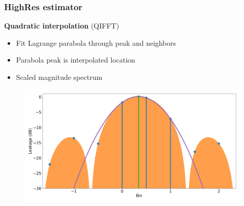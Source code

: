 \documentclass[table]{beamer}
\begin{document}
\logo{}
\begin{frame}
\frametitle{HighRes estimator}
    {\large \textbf{Quadratic interpolation} (QIFFT)}
    \begin{itemize}
        \item Fit Lagrange parabola through peak and neighbors
        \item Parabola peak is interpolated location
        \item Scaled magnitude spectrum
    \end{itemize}

    \begin{figure}[H]
        \includegraphics[width=0.90\linewidth]{figures/qifft.png}
    \end{figure}
\end{frame}
\end{document}
